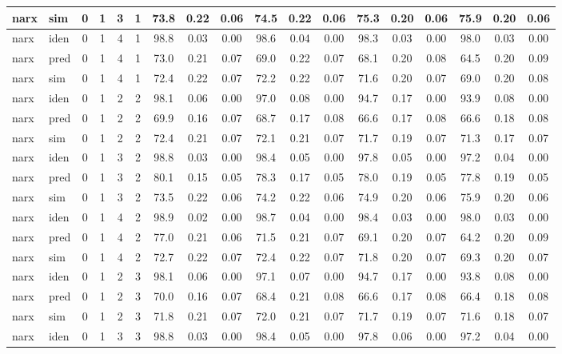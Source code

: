 \begin{landscape}
\begin{center}
\begin{longtable}{ll|cccc|ccc|ccc|ccc|ccc}
narx & sim  & 0 & 1 & 3 & 1 & 73.8 & 0.22 & 0.06 & 74.5 & 0.22 & 0.06 & 75.3 & 0.20 & 0.06 & 75.9 & 0.20 & 0.06 \\ 
 \hline 
narx & iden & 0 & 1 & 4 & 1 & 98.8 & 0.03 & 0.00 & 98.6 & 0.04 & 0.00 & 98.3 & 0.03 & 0.00 & 98.0 & 0.03 & 0.00 \\ 
narx & pred & 0 & 1 & 4 & 1 & 73.0 & 0.21 & 0.07 & 69.0 & 0.22 & 0.07 & 68.1 & 0.20 & 0.08 & 64.5 & 0.20 & 0.09 \\ 
narx & sim  & 0 & 1 & 4 & 1 & 72.4 & 0.22 & 0.07 & 72.2 & 0.22 & 0.07 & 71.6 & 0.20 & 0.07 & 69.0 & 0.20 & 0.08 \\ 
 \hline 
narx & iden & 0 & 1 & 2 & 2 & 98.1 & 0.06 & 0.00 & 97.0 & 0.08 & 0.00 & 94.7 & 0.17 & 0.00 & 93.9 & 0.08 & 0.00 \\ 
narx & pred & 0 & 1 & 2 & 2 & 69.9 & 0.16 & 0.07 & 68.7 & 0.17 & 0.08 & 66.6 & 0.17 & 0.08 & 66.6 & 0.18 & 0.08 \\ 
narx & sim  & 0 & 1 & 2 & 2 & 72.4 & 0.21 & 0.07 & 72.1 & 0.21 & 0.07 & 71.7 & 0.19 & 0.07 & 71.3 & 0.17 & 0.07 \\ 
 \hline 
narx & iden & 0 & 1 & 3 & 2 & 98.8 & 0.03 & 0.00 & 98.4 & 0.05 & 0.00 & 97.8 & 0.05 & 0.00 & 97.2 & 0.04 & 0.00 \\ 
narx & pred & 0 & 1 & 3 & 2 & 80.1 & 0.15 & 0.05 & 78.3 & 0.17 & 0.05 & 78.0 & 0.19 & 0.05 & 77.8 & 0.19 & 0.05 \\ 
narx & sim  & 0 & 1 & 3 & 2 & 73.5 & 0.22 & 0.06 & 74.2 & 0.22 & 0.06 & 74.9 & 0.20 & 0.06 & 75.9 & 0.20 & 0.06 \\ 
 \hline 
narx & iden & 0 & 1 & 4 & 2 & 98.9 & 0.02 & 0.00 & 98.7 & 0.04 & 0.00 & 98.4 & 0.03 & 0.00 & 98.0 & 0.03 & 0.00 \\ 
narx & pred & 0 & 1 & 4 & 2 & 77.0 & 0.21 & 0.06 & 71.5 & 0.21 & 0.07 & 69.1 & 0.20 & 0.07 & 64.2 & 0.20 & 0.09 \\ 
narx & sim  & 0 & 1 & 4 & 2 & 72.7 & 0.22 & 0.07 & 72.4 & 0.22 & 0.07 & 71.8 & 0.20 & 0.07 & 69.3 & 0.20 & 0.07 \\ 
 \hline 
narx & iden & 0 & 1 & 2 & 3 & 98.1 & 0.06 & 0.00 & 97.1 & 0.07 & 0.00 & 94.7 & 0.17 & 0.00 & 93.8 & 0.08 & 0.00 \\ 
narx & pred & 0 & 1 & 2 & 3 & 70.0 & 0.16 & 0.07 & 68.4 & 0.21 & 0.08 & 66.6 & 0.17 & 0.08 & 66.4 & 0.18 & 0.08 \\ 
narx & sim  & 0 & 1 & 2 & 3 & 71.8 & 0.21 & 0.07 & 72.0 & 0.21 & 0.07 & 71.7 & 0.19 & 0.07 & 71.6 & 0.18 & 0.07 \\ 
 \hline 
narx & iden & 0 & 1 & 3 & 3 & 98.8 & 0.03 & 0.00 & 98.4 & 0.05 & 0.00 & 97.8 & 0.06 & 0.00 & 97.2 & 0.04 & 0.00 \\ 

\end{longtable}
\end{center}
\end{landscape}
